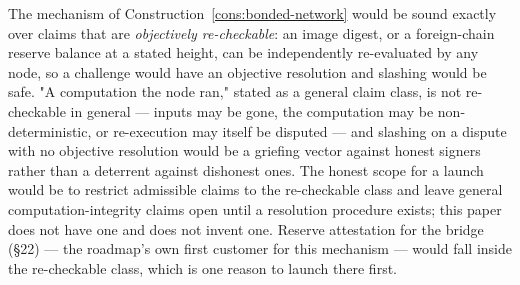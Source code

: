 \begin{openproblem}
\label{op:claim-classes}
The mechanism of Construction~\ref{cons:bonded-network} would be sound exactly over claims that are
\emph{objectively re-checkable}: an image digest, or a foreign-chain reserve balance at a stated
height, can be independently re-evaluated by any node, so a challenge would have an objective
resolution and slashing would be safe. "A computation the node ran," stated as a general claim
class, is not re-checkable in general — inputs may be gone, the computation may be
non-deterministic, or re-execution may itself be disputed — and slashing on a dispute with no
objective resolution would be a griefing vector against honest signers rather than a deterrent
against dishonest ones. The honest scope for a launch would be to restrict admissible claims to the
re-checkable class and leave general computation-integrity claims open until a resolution procedure
exists; this paper does not have one and does not invent one.
 Reserve attestation for the
bridge (\S22) — the roadmap's own first customer for this mechanism — would fall inside the
re-checkable class, which is one reason to launch there first.
\end{openproblem}

